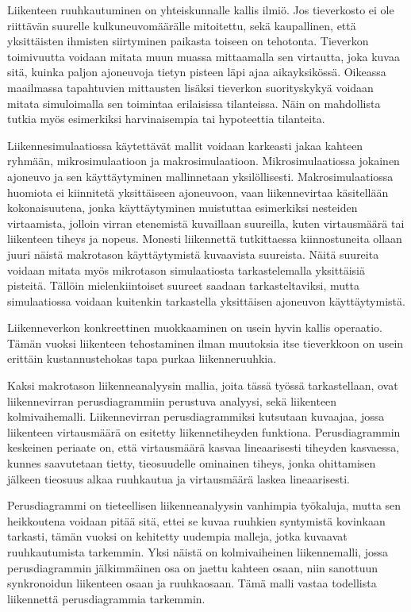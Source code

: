 \documentclass[english, 12pt, a4paper, elec, utf8, pdfa, online]{aaltothesis}
\begin{document}
\begin{abstractpage}[finnish]
    {\scriptsize
    Liikenteen ruuhkautuminen on yhteiskunnalle kallis ilmiö. Jos tieverkosto ei ole riittävän suurelle kulkuneuvomäärälle mitoitettu, sekä kaupallinen, että yksittäisten ihmisten siirtyminen paikasta toiseen on tehotonta. Tieverkon toimivuutta voidaan mitata muun muassa mittaamalla sen virtautta, joka kuvaa sitä, kuinka paljon ajoneuvoja tietyn pisteen läpi ajaa aikayksikössä. Oikeassa maailmassa tapahtuvien mittausten lisäksi tieverkon suorityskykyä voidaan mitata simuloimalla sen toimintaa erilaisissa tilanteissa. Näin on mahdollista tutkia myös esimerkiksi harvinaisempia tai hypoteettia tilanteita.

    Liikennesimulaatiossa käytettävät mallit voidaan karkeasti jakaa kahteen ryhmään, mikrosimulaatioon ja makrosimulaatioon. Mikrosimulaatiossa jokainen ajoneuvo ja sen käyttäytyminen mallinnetaan yksilöllisesti. Makrosimulaatiossa huomiota ei kiinnitetä yksittäiseen ajoneuvoon, vaan liikennevirtaa käsitellään kokonaisuutena, jonka käyttäytyminen muistuttaa esimerkiksi nesteiden virtaamista, jolloin virran etenemistä kuvaillaan suureilla, kuten virtausmäärä tai liikenteen tiheys ja nopeus. Monesti liikennettä tutkittaessa kiinnostuneita ollaan juuri näistä makrotason käyttäytymistä kuvaavista suureista. Näitä suureita voidaan mitata myös mikrotason simulaatiosta tarkastelemalla yksittäisiä pisteitä. Tällöin mielenkiintoiset suureet saadaan tarkasteltaviksi, mutta simulaatiossa voidaan kuitenkin tarkastella yksittäisen ajoneuvon käyttäytymistä.

    Liikenneverkon konkreettinen muokkaaminen on usein hyvin kallis operaatio. Tämän vuoksi liikenteen tehostaminen ilman muutoksia itse tieverkkoon on usein erittäin kustannustehokas tapa purkaa liikenneruuhkia. 

    Kaksi makrotason liikenneanalyysin mallia, joita tässä työssä tarkastellaan, ovat liikennevirran perusdiagrammiin perustuva analyysi, sekä liikenteen kolmivaihemalli. Liikennevirran perusdiagrammiksi kutsutaan kuvaajaa, jossa liikenteen virtausmäärä on esitetty liikennetiheyden funktiona. Perusdiagrammin keskeinen periaate on, että virtausmäärä kasvaa lineaarisesti tiheyden kasvaessa, kunnes saavutetaan tietty, tieosuudelle ominainen tiheys, jonka ohittamisen jälkeen tieosuus alkaa ruuhkautua ja virtausmäärä laskea lineaarisesti.

    Perusdiagrammi on tieteellisen liikenneanalyysin vanhimpia työkaluja, mutta sen heikkoutena voidaan pitää sitä, ettei se kuvaa ruuhkien syntymistä kovinkaan tarkasti, tämän vuoksi on kehitetty uudempia malleja, jotka kuvaavat ruuhkautumista tarkemmin. Yksi näistä on kolmivaiheinen liikennemalli, jossa perusdiagrammin jälkimmäinen osa on jaettu kahteen osaan, niin sanottuun synkronoidun liikenteen osaan ja ruuhkaosaan. Tämä malli vastaa todellista liikennettä perusdiagrammia tarkemmin.

}
\end{abstractpage}
\end{document}
